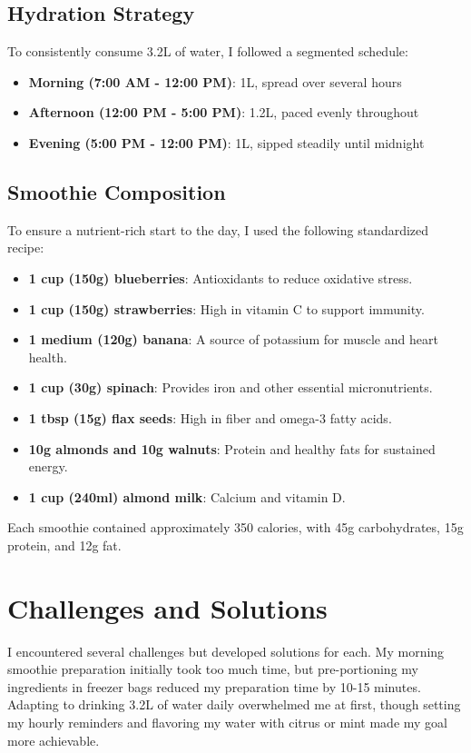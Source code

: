 \documentclass[11pt]{article}
\begin{document}
\subsection*{Hydration Strategy}\vspace{-1.2em}
To consistently consume 3.2L of water, I followed a segmented schedule:
\begin{itemize}
    \item \textbf{Morning (7:00 AM - 12:00 PM)}: 1L, spread over several hours  
    \item \textbf{Afternoon (12:00 PM - 5:00 PM)}: 1.2L, paced evenly throughout  
    \item \textbf{Evening (5:00 PM - 12:00 PM)}: 1L, sipped steadily until midnight  
\end{itemize}

\subsection*{Smoothie Composition}\vspace{-1.2em}
To ensure a nutrient-rich start to the day, I used the following standardized recipe:
\begin{itemize}
    \item \textbf{1 cup (150g) blueberries}: Antioxidants to reduce oxidative stress.
    \item \textbf{1 cup (150g) strawberries}: High in vitamin C to support immunity.
    \item \textbf{1 medium (120g) banana}: A source of potassium for muscle and heart health.
    \item \textbf{1 cup (30g) spinach}: Provides iron and other essential micronutrients.
    \item \textbf{1 tbsp (15g) flax seeds}: High in fiber and omega-3 fatty acids.
    \item \textbf{10g almonds and 10g walnuts}: Protein and healthy fats for sustained energy.
    \item \textbf{1 cup (240ml) almond milk}: Calcium and vitamin D.
\end{itemize}
Each smoothie contained approximately 350 calories, with 45g carbohydrates, 15g protein, and 12g fat.

\section*{Challenges and Solutions}\vspace{-1em}
I encountered several challenges but developed solutions for each. My morning smoothie preparation initially took too much time, but pre-portioning my ingredients in freezer bags reduced my preparation time by 10-15 minutes. Adapting to drinking 3.2L of water daily overwhelmed me at first, though setting my hourly reminders and flavoring my water with citrus or mint made my goal more achievable.
\end{document}
